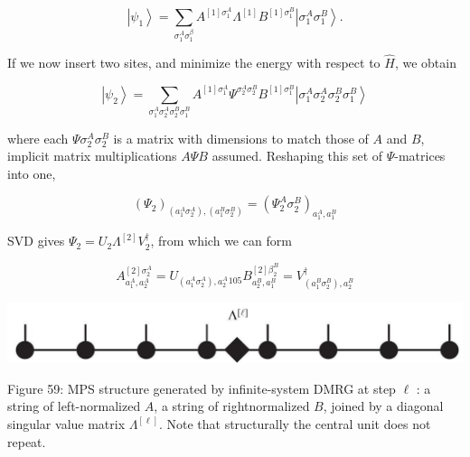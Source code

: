 \documentclass[12pt]{article}
\begin{document}
\begin{equation*}
\left|\psi_{1}\right\rangle=\sum_{\sigma_{1}^{A} \sigma_{1}^{\beta}} A^{[1] \sigma_{1}^{A}} \Lambda^{[1]} B^{[1] \sigma_{1}^{B}}\left|\sigma_{1}^{A} \sigma_{1}^{B}\right\rangle . \tag{323}
\end{equation*}


If we now insert two sites, and minimize the energy with respect to $\hat{H}$, we obtain


\begin{equation*}
\left|\psi_{2}\right\rangle=\sum_{\sigma_{1}^{A} \sigma_{2}^{A} \sigma_{2}^{B} \sigma_{1}^{B}} A^{[1] \sigma_{1}^{A}} \Psi^{\sigma_{2}^{A} \sigma_{2}^{B}} B^{[1] \sigma_{1}^{B}}\left|\sigma_{1}^{A} \sigma_{2}^{A} \sigma_{2}^{B} \sigma_{1}^{B}\right\rangle \tag{324}
\end{equation*}


where each $\Psi \sigma_{2}^{A} \sigma_{2}^{B}$ is a matrix with dimensions to match those of $A$ and $B$, implicit matrix multiplications $A \Psi B$ assumed. Reshaping this set of $\Psi$-matrices into one,


\begin{equation*}
\left(\Psi_{2}\right)_{\left(a_{1}^{A} \sigma_{2}^{A}\right),\left(a_{1}^{B} \sigma_{2}^{B}\right)}=\left(\Psi_{2}^{A} \sigma_{2}^{B}\right)_{a_{1}^{A}, a_{1}^{B}} \tag{325}
\end{equation*}


SVD gives $\Psi_{2}=U_{2} \Lambda^{[2]} V_{2}^{\dagger}$, from which we can form


\begin{equation*}
A_{a_{1}^{A}, a_{2}^{A}}^{[2] \sigma_{2}^{A}}=U_{\left(a_{1}^{A} \sigma_{2}^{A}\right), a_{2}^{A}}{ }_{105} B_{a_{2}^{B}, a_{1}^{B}}^{[2] \beta_{2}^{B}}=V_{\left(a_{1}^{B} \sigma_{2}^{B}\right), a_{2}^{B}}^{\dagger} \tag{326}
\end{equation*}


\begin{center}
\includegraphics[max width=\textwidth]{2024_05_04_afc4ad226da9ccfe0ac8g-106}
\end{center}

Figure 59: MPS structure generated by infinite-system DMRG at step $\ell$ : a string of left-normalized $A$, a string of rightnormalized $B$, joined by a diagonal singular value matrix $\Lambda^{[\ell]}$. Note that structurally the central unit does not repeat.
\end{document}
